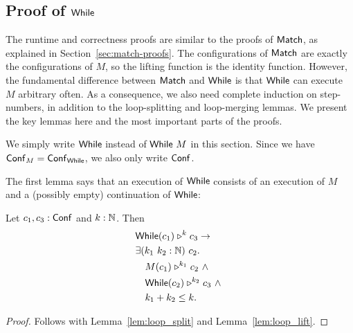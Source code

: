 \subsection{Proof of $\mathsf{While}$}
\label{sec:while-proofs}

The runtime and correctness proofs are similar to the proofs of $\mathsf{Match}$, as explained in Section~\ref{sec:match-proofs}.  The configurations of
$\mathsf{Match}$ are exactly the configurations of $M$, so the lifting function is the identity function.  However, the fundamental difference between
$\mathsf{Match}$ and $\mathsf{While}$ is that $\mathsf{While}$ can execute $M$ arbitrary often.  As a consequence, we also need complete induction on step-numbers, in
addition to the loop-splitting and loop-merging lemmas.  We present the key lemmas here and the most important parts of the proofs.

We simply write $\mathsf{While}$ instead of $\mathsf{While}~M$ in this section.  Since we have $\mathsf{Conf}_M = \mathsf{Conf}_{\mathsf{While}}$, we also only write $\mathsf{Conf}$.

The first lemma says that an execution of $\mathsf{While}$ consists of an execution of $M$ and a (possibly empty) continuation of $\mathsf{While}$:
\begin{lemma}
  \label{lem:While_split}
  Let $c_1, c_3 : \mathsf{Conf}$ and $k:\mathbb{N}$.  Then
  \begin{alignat*}{1}
    & \mathsf{While}(c_1) \mathrel{\triangleright}^k c_3 \rightarrow \\
    & \exists (k_1~k_2 : \mathbb{N})~c_2. \\
    & \quad M(c_1) \mathrel{\triangleright}^{k_1} c_2 ~\land~ \\
    & \quad \mathsf{While}(c_2) \mathrel{\triangleright}^{k_2} c_3 ~\land~\\
    & \quad k_1 + k_2 \leq k.
  \end{alignat*}
\end{lemma}
\begin{proof}
  Follows with Lemma~\ref{lem:loop_split} and Lemma~\ref{lem:loop_lift}.
\end{proof}

